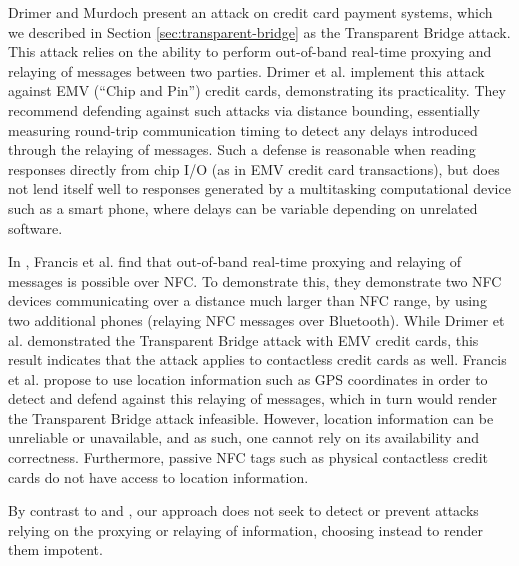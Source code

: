 Drimer and Murdoch \cite{Drimer:2007:KYE:1362903.1362910} present an attack on credit card payment systems,
    which we described in Section \ref{sec:transparent-bridge} as the Transparent Bridge attack.
This attack relies on the ability to perform out-of-band real-time proxying and relaying of messages between two parties.
Drimer et al. implement this attack against EMV (``Chip and Pin'') credit cards, demonstrating its practicality.
They recommend defending against such attacks via distance bounding,
    essentially measuring round-trip communication timing to detect any delays introduced through the relaying of messages.
Such a defense is reasonable when reading responses directly from chip I/O (as in EMV credit card transactions),
    but does not lend itself well to responses generated by a multitasking computational device such as a smart phone,
    where delays can be variable depending on unrelated software.

In \cite{francis2010practical}, Francis et al. find that out-of-band real-time proxying and relaying of messages is possible over NFC.
To demonstrate this, they demonstrate two NFC devices communicating over a distance much larger than NFC range,
    by using two additional phones (relaying NFC messages over Bluetooth).
While Drimer et al. demonstrated the Transparent Bridge attack with EMV credit cards,
    this result indicates that the attack applies to contactless credit cards as well.
Francis et al. propose to use location information such as GPS coordinates in order to detect and defend against this relaying of messages,
    which in turn would render the Transparent Bridge attack infeasible.
However, location information can be unreliable or unavailable, and as such, one cannot rely on its availability and correctness.
Furthermore, passive NFC tags such as physical contactless credit cards do not have access to location information.

By contrast to \cite{francis2010practical} and \cite{Drimer:2007:KYE:1362903.1362910},
    our approach does not seek to detect or prevent attacks relying on the proxying or relaying of information, choosing instead to render them impotent.


